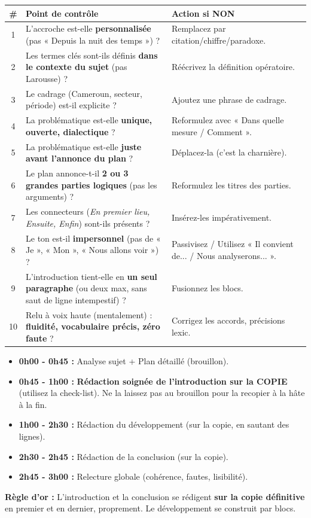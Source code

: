 \documentclass[11pt]{article}
\begin{document}
\begin{center}
\begin{tabularx}{\linewidth}{|c|l|X|}\hline
\# & \textbf{Point de contrôle} & \textbf{Action si NON} \\ \hline
1 & L'accroche est-elle \textbf{personnalisée} (pas « Depuis la nuit des temps ») ? & Remplacez par citation/chiffre/paradoxe. \\ \hline
2 & Les termes clés sont-ils définis \textbf{dans le contexte du sujet} (pas Larousse) ? & Réécrivez la définition opératoire. \\ \hline
3 & Le cadrage (Cameroun, secteur, période) est-il explicite ? & Ajoutez une phrase de cadrage. \\ \hline
4 & La problématique est-elle \textbf{unique, ouverte, dialectique} ? & Reformulez avec « Dans quelle mesure / Comment ». \\ \hline
5 & La problématique est-elle \textbf{juste avant l'annonce du plan} ? & Déplacez-la (c'est la charnière). \\ \hline
6 & Le plan annonce-t-il \textbf{2 ou 3 grandes parties logiques} (pas les arguments) ? & Reformulez les titres des parties. \\ \hline
7 & Les connecteurs (\textit{En premier lieu, Ensuite, Enfin}) sont-ils présents ? & Insérez-les impérativement. \\ \hline
8 & Le ton est-il \textbf{impersonnel} (pas de « Je », « Mon », « Nous allons voir ») ? & Passivisez / Utilisez « Il convient de... / Nous analyserons... ». \\ \hline
9 & L'introduction tient-elle en \textbf{un seul paragraphe} (ou deux max, sans saut de ligne intempestif) ? & Fusionnez les blocs. \\ \hline
10 & Relu à voix haute (mentalement) : \textbf{fluidité, vocabulaire précis, zéro faute} ? & Corrigez les accords, précisions lexic. \\ \hline
\end{tabularx}
\end{center}

\begin{methode}
\begin{itemize}
    \item \textbf{0h00 - 0h45 :} Analyse sujet + Plan détaillé (brouillon).
    \item \textbf{0h45 - 1h00 :} \textbf{Rédaction soignée de l'introduction sur la COPIE} (utilisez la check-list). Ne la laissez pas au brouillon pour la recopier à la hâte à la fin.
    \item \textbf{1h00 - 2h30 :} Rédaction du développement (sur la copie, en sautant des lignes).
    \item \textbf{2h30 - 2h45 :} Rédaction de la conclusion (sur la copie).
    \item \textbf{2h45 - 3h00 :} Relecture globale (cohérence, fautes, lisibilité).
\end{itemize}
\textbf{Règle d'or :} L'introduction et la conclusion se rédigent \textbf{sur la copie définitive} en premier et en dernier, proprement. Le développement se construit par blocs.
\end{methode}
\end{document}
